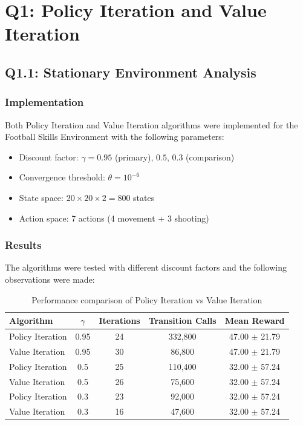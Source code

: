 \documentclass[10pt,a4paper]{article}
\begin{document}
\section{Q1: Policy Iteration and Value Iteration}

\subsection{Q1.1: Stationary Environment Analysis}

\subsubsection{Implementation}

Both Policy Iteration and Value Iteration algorithms were implemented for the Football Skills Environment with the following parameters:
\begin{itemize}
    \item Discount factor: $\gamma = 0.95$ (primary), $0.5$, $0.3$ (comparison)
    \item Convergence threshold: $\theta = 10^{-6}$
    \item State space: $20 \times 20 \times 2 = 800$ states
    \item Action space: 7 actions (4 movement + 3 shooting)
\end{itemize}

\subsubsection{Results}

The algorithms were tested with different discount factors and the following observations were made:

\begin{table}[H]
\centering
\caption{Performance comparison of Policy Iteration vs Value Iteration}
\begin{tabular}{lcccc}
\toprule
Algorithm & $\gamma$ & Iterations & Transition Calls & Mean Reward \\
\midrule
Policy Iteration & 0.95 & 24 & 332,800 & 47.00 $\pm$ 21.79 \\
Value Iteration & 0.95 & 30 & 86,800 & 47.00 $\pm$ 21.79 \\
Policy Iteration & 0.5 & 25 & 110,400 & 32.00 $\pm$ 57.24 \\
Value Iteration & 0.5 & 26 & 75,600 & 32.00 $\pm$ 57.24 \\
Policy Iteration & 0.3 & 23 & 92,000 & 32.00 $\pm$ 57.24 \\
Value Iteration & 0.3 & 16 & 47,600 & 32.00 $\pm$ 57.24 \\
\bottomrule
\end{tabular}
\end{table}
\clearpage
\end{document}
